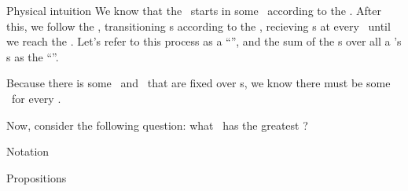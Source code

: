 \begin{part} {Physical intuition}
  We know that the \agt\ starts in some \til\ according to the \ind.
  After this, we follow the \str, 
  transitioning \til{}s according to the \trd, recieving \rwd{}s 
  at every \til\ until
  we reach the \lmt. Let's refer to this process as a ``\run'', and
  the sum of the \rwd{}s over all a \run's \til{}s
  as the ``\trwd''.

  Because there is some \ind\ and \trd\ 
  that are fixed over \run{}s, 
  we know there must be 
  some \atrwd\ for every \str.

  Now, consider the following question: 
  what \str\ has the greatest \atrwd?
\end{part}

\begin{part}{Notation}
  
  
  
  
  
  
  
  
  
  
  
  
  
  
  
  
\end{part}

\begin{part}{Propositions}
\end{part}
